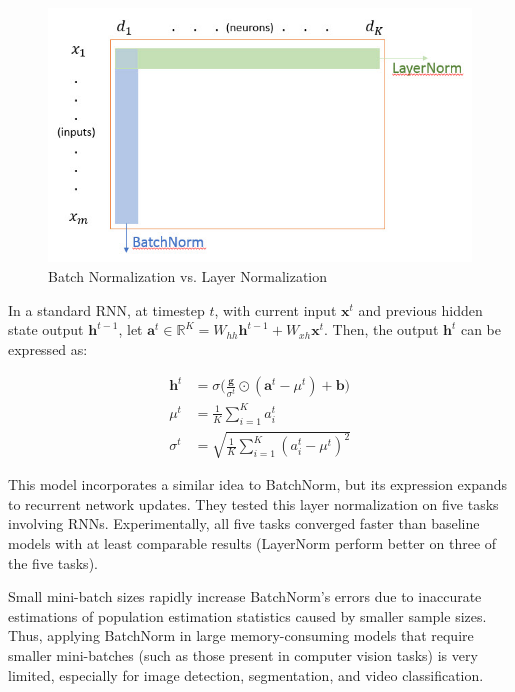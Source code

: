 \documentclass{article}
\begin{document}
\begin{figure}[h]
	\centering
    \includegraphics[scale=0.5]{pics/batchNorm/BatchNorm_vs_LayerNorm.jpg}
	\caption{Batch Normalization vs. Layer Normalization}
	\label{fig:batchvslayernorm}
\end{figure}

In a standard RNN, at timestep $t$, with current input $\textbf{x}^t$ and previous hidden state output $\textbf{h}^{t-1}$, let $\textbf{a}^t \in \mathbb{R}^K = W_{hh}\textbf{h}^{t-1}+W_{xh}\textbf{x}^t$. Then, the output $\textbf{h}^t$ can be expressed as:

\begin{align*}
    \textbf{h}^t&=\sigma\Big(\frac{\textbf{g}}{\sigma^t}\odot(\textbf{a}^t - \mu^t) + \textbf{b}\Big)\\
    \mu^t&=\frac{1}{K}\sum_{i=1}^Ka_i^t\\
    \sigma^t&=\sqrt{\frac{1}{K}\sum_{i=1}^K(a_i^t-\mu^t)^2}
\end{align*}

This model incorporates a similar idea to BatchNorm, but its expression expands to recurrent network updates. They tested this layer normalization on five tasks involving RNNs. Experimentally, all five tasks converged faster than baseline models with at least comparable results (LayerNorm perform better on three of the five tasks).

\textbf{}

Small mini-batch sizes rapidly increase BatchNorm's errors due to inaccurate estimations of population estimation statistics caused by smaller sample sizes. Thus, applying BatchNorm in large memory-consuming models that require smaller mini-batches (such as those present in computer vision tasks) is very limited, especially for image detection, segmentation, and video classification. 
\end{document}
